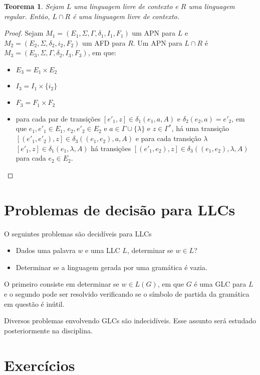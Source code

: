 \documentclass[a4paper]{article}
\newtheorem{Theorem}{Teorema}
\theoremstyle{definition}
\begin{document}
  \begin{Theorem}
    Sejam $L$ uma linguagem livre de contexto e $R$ uma linguagem regular.
    Então, $L \cap R$ é uma linguagem livre de contexto.
  \end{Theorem}
  \begin{proof}
    Sejam $M_1 = (E_1,\Sigma,\Gamma, \delta_1, I_1,F_1)$ um APN para $L$ e
    $M_2 = (E_2,\Sigma,\delta_2,i_2,F_2)$ um AFD para $R$. Um APN para $L\cap R$ é
    $M_3 = (E_3,\Sigma,\Gamma, \delta_2,I_3,F_3)$, em que:
    \begin{itemize}
       \item $E_3 = E_1 \times E_2$
       \item $I_3 = I_1 \times \{i_2\}$
       \item $F_3 = F_1 \times F_2$
       \item para cada par de transições $[e'_1,z] \in \delta_1(e_1,a,A)$ e
         $\delta_2(e_2,a) = e'_2$, em que $e_1,e'_1 \in E_1$, $e_2,e'_2\in E_2$
         e $a\in \Gamma \cup \{\lambda\}$ e $z \in \Gamma^*$, há uma transição
         $[(e'_1,e'_2),z] \in \delta_3((e_1,e_2),a,A)$ e para cada transição
         $\lambda$ $[e'_1,z] \in \delta_1(e_1,\lambda,A)$ há transições
         $[(e'_1,e_2),z] \in \delta_3((e_1,e_2),\lambda,A)$ para cada
         $e_2 \in E_2$.
    \end{itemize}
  \end{proof}

  \section{Problemas de decisão para LLCs}

  O seguintes problemas são decidíveis para LLCs
  \begin{itemize}
    \item Dados uma palavra $w$ e uma LLC $L$, determinar se $w \in L$?
    \item Determinar se a linguagem gerada por  uma gramática é vazia.  
  \end{itemize}

  O primeiro consiste em determinar se $w \in L(G)$, em que $G$ é uma GLC para
  $L$ e o segundo pode ser resolvido verificando se o símbolo de partida da
  gramática em questão é inútil.

  Diversos problemas envolvendo GLCs são indecidíveis. Esse assunto será
  estudado posteriormente na disciplina.
  
  \section{Exercícios} 
\end{document}
